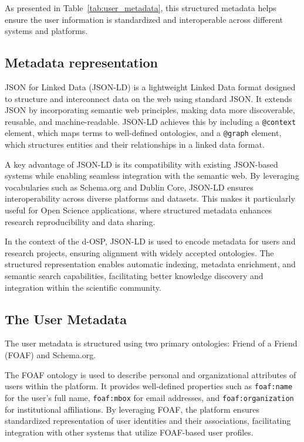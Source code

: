 \documentclass[final]{rc-book-2.14}
\begin{document}
As presented in Table~\ref{tab:user_metadata}, this structured metadata helps ensure the user information is standardized and interoperable across different systems and platforms.


\subsection{Metadata representation}

JSON for Linked Data (JSON-LD) is a lightweight Linked Data format designed to structure and interconnect data on the web using standard JSON. It extends JSON by incorporating semantic web principles, making data more discoverable, reusable, and machine-readable. JSON-LD achieves this by including a \texttt{@context} element, which maps terms to well-defined ontologies, and a \texttt{@graph} element, which structures entities and their relationships in a linked data format.

A key advantage of JSON-LD is its compatibility with existing JSON-based systems while enabling seamless integration with the semantic web. By leveraging vocabularies such as Schema.org and Dublin Core, JSON-LD ensures interoperability across diverse platforms and datasets. This makes it particularly useful for Open Science applications, where structured metadata enhances research reproducibility and data sharing.

In the context of the d-OSP, JSON-LD is used to encode metadata for users and research projects, ensuring alignment with widely accepted ontologies. The structured representation enables automatic indexing, metadata enrichment, and semantic search capabilities, facilitating better knowledge discovery and integration within the scientific community.


\subsection{The User Metadata}

The user metadata is structured using two primary ontologies: Friend of a Friend (FOAF) and Schema.org.

The FOAF ontology is used to describe personal and organizational attributes of users within the platform. It provides well-defined properties such as \texttt{foaf:name} for the user’s full name, \texttt{foaf:mbox} for email addresses, and \texttt{foaf:organization} for institutional affiliations. By leveraging FOAF, the platform ensures standardized representation of user identities and their associations, facilitating integration with other systems that utilize FOAF-based user profiles.
\end{document}
